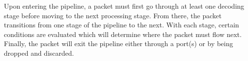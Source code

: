 Upon entering the pipeline, a packet must first go through at least one decoding
stage before moving to the next processing stage. From there, the packet
transitions from one stage of the pipeline to the next. With each stage, certain
conditions are evaluated which will determine where the packet must flow next.
Finally, the packet will exit the pipeline either through a port(s) or by being
dropped and discarded.

